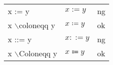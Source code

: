 \documentclass[preview]{standalone}
\newcommand{\tA}[1]{\textcolor{cA}{#1}}
\newcommand{\tD}[1]{\textcolor{cD}{#1}}
\begin{document}
\begin{table}[h]
    \centering
    \begin{tabular}{lll}
        x := y                   & $x := y$        & \tD{ng} \\
        x $\backslash$coloneqq y & $x \coloneqq y$ & \tA{ok} \\
        x ::= y                  & $x ::= y$       & \tD{ng} \\
        x $\backslash$Coloneqq y & $x \Coloneqq y$ & \tA{ok}
    \end{tabular}
\end{table}
\end{document}
